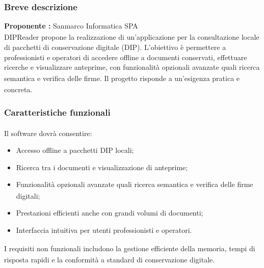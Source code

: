 \documentclass[a4paper,11pt]{article}
\begin{document}
\subsubsection{Breve descrizione}
\textbf{Proponente\textsubscript{}
:} Sanmarco Informatica SPA
\vspace{0.5em}\\
DIPReader propone la realizzazione di un'applicazione per la consultazione locale di pacchetti di conservazione digitale (DIP). L'obiettivo è permettere a professionisti e operatori di accedere offline a documenti conservati, effettuare ricerche e visualizzare anteprime, con funzionalità\textsubscript{}
 opzionali avanzate quali ricerca semantica e verifica\textsubscript{} delle firme. Il progetto\textsubscript{}
 risponde a un'esigenza pratica e concreta.

\subsubsection{Caratteristiche funzionali\textsubscript{}
}
Il software dovrà consentire:
\begin{itemize}[leftmargin=*]
  \item Accesso offline a pacchetti DIP locali;
  \item Ricerca tra i documenti e visualizzazione di anteprime;
  \item Funzionalità\textsubscript{}
 opzionali avanzate quali ricerca semantica e verifica\textsubscript{} delle firme digitali;
  \item Prestazioni efficienti anche con grandi volumi di documenti;
  \item Interfaccia\textsubscript{} intuitiva per utenti professionisti e operatori.
\end{itemize}
I requisiti\textsubscript{}
 non funzionali\textsubscript{}
 includono la gestione efficiente della memoria, tempi di risposta rapidi e la conformità a standard di conservazione digitale.
\end{document}
